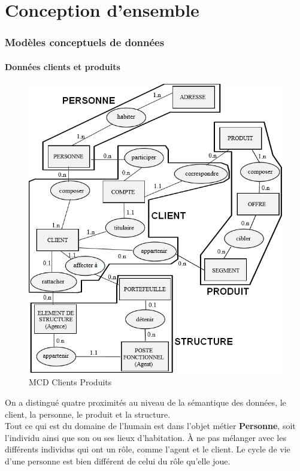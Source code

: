 \part{Conception d'ensemble}
\setcounter{section}{0}

\section{Modèles conceptuels de données} 

\subsection{Données clients et produits} 

\begin{figure}[H]
\centering
\includegraphics[width=\textwidth]{figures/mcd/MCD_Clients_Produits}
\caption{MCD Clients Produits}
\end{figure}

On a distingué quatre proximités au niveau de la sémantique des données, le client, la personne, le produit et la structure. \\

Tout ce qui est du domaine de l'humain est dans l'objet métier \textbf{Personne}, soit l'individu ainsi que son ou ses lieux d'habitation. À ne pas mélanger avec les différents individus qui ont un rôle, comme l'agent et le client. Le cycle de vie d'une personne est bien différent de celui du rôle qu'elle joue. \\

